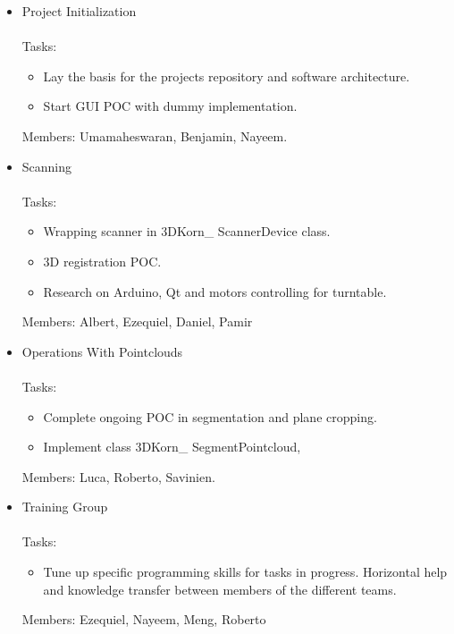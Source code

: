 \documentclass[11pt]{article} %
\begin{document}
\begin{itemize}
\item Project Initialization\\
~\\Tasks:
\begin{itemize}
\item Lay the basis for the projects repository and software architecture.
\item Start GUI POC with dummy implementation.
\end{itemize}
Members: Umamaheswaran, Benjamin, Nayeem.

\item Scanning ~\\
~\\Tasks:
\begin{itemize}
\item Wrapping scanner in 3DKorn\_ ScannerDevice class. 
\item 3D registration POC.
\item Research on Arduino, Qt and motors controlling for turntable.
\end{itemize}
Members: Albert, Ezequiel, Daniel, Pamir
	

\item Operations With Pointclouds~\\
~\\Tasks:
\begin{itemize}
\item Complete ongoing POC in segmentation and plane cropping.
\item Implement class 3DKorn\_ SegmentPointcloud, 
\end{itemize}
Members: Luca, Roberto, Savinien.


\item Training Group~\\
~\\Tasks:
\begin{itemize}
\item Tune up specific programming skills for tasks in progress. Horizontal help and knowledge transfer between members of the different teams. 
\end{itemize}
Members: Ezequiel, Nayeem, Meng, Roberto
\end{itemize}
\end{document}
